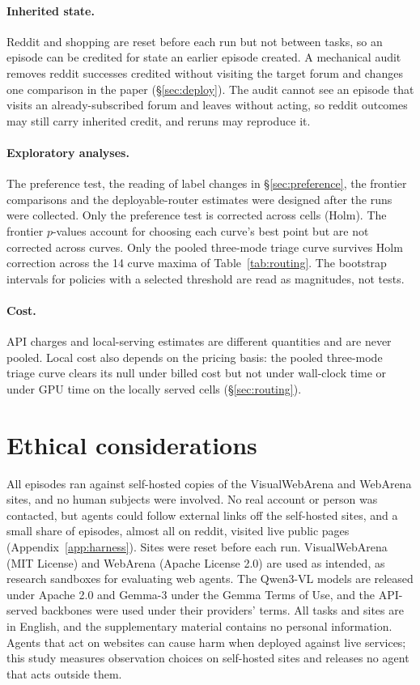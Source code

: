 \paragraph{Inherited state.} Reddit and shopping are reset before each run but not between tasks, so an episode can be credited for state an earlier episode created. A mechanical audit removes reddit successes credited without visiting the target forum and changes one comparison in the paper (\S\ref{sec:deploy}). The audit cannot see an episode that visits an already-subscribed forum and leaves without acting, so reddit outcomes may still carry inherited credit, and reruns may reproduce it.

\paragraph{Exploratory analyses.} The preference test, the reading of label changes in \S\ref{sec:preference}, the frontier comparisons and the deployable-router estimates were designed after the runs were collected. Only the preference test is corrected across cells (Holm). The frontier $p$-values account for choosing each curve's best point but are not corrected across curves. Only the pooled three-mode triage curve survives Holm correction across the 14 curve maxima of Table~\ref{tab:routing}. The bootstrap intervals for policies with a selected threshold are read as magnitudes, not tests.

\paragraph{Cost.} API charges and local-serving estimates are different quantities and are never pooled. Local cost also depends on the pricing basis: the pooled three-mode triage curve clears its null under billed cost but not under wall-clock time or under GPU time on the locally served cells (\S\ref{sec:routing}).

\section*{Ethical considerations}

All episodes ran against self-hosted copies of the VisualWebArena and WebArena sites, and no human subjects were involved. No real account or person was contacted, but agents could follow external links off the self-hosted sites, and a small share of episodes, almost all on reddit, visited live public pages (Appendix~\ref{app:harness}). Sites were reset before each run. VisualWebArena (MIT License) and WebArena (Apache License 2.0) are used as intended, as research sandboxes for evaluating web agents. The Qwen3-VL models are released under Apache 2.0 and Gemma-3 under the Gemma Terms of Use, and the API-served backbones were used under their providers' terms. All tasks and sites are in English, and the supplementary material contains no personal information. Agents that act on websites can cause harm when deployed against live services; this study measures observation choices on self-hosted sites and releases no agent that acts outside them.

